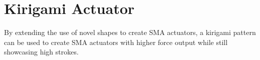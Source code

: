 \chapter{Kirigami Actuator}
By extending the use of novel shapes to create SMA actuators, a kirigami pattern can be used to create SMA actuators with higher force output while still showcasing high strokes.
